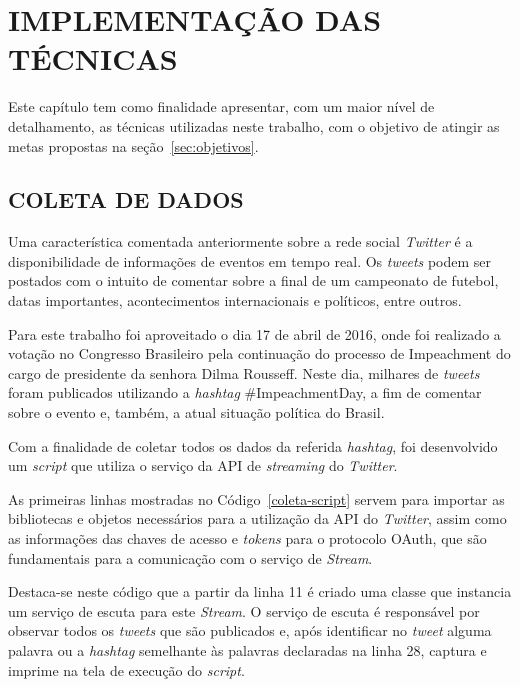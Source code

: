 \chapter{IMPLEMENTAÇÃO DAS TÉCNICAS}\label{ch:implementacao}

Este capítulo tem como finalidade apresentar, com um maior nível de detalhamento, as técnicas utilizadas neste trabalho, com o objetivo de atingir as metas propostas na seção~\ref{sec:objetivos}.

\section{COLETA DE DADOS}
Uma característica comentada anteriormente sobre a rede social \textit{Twitter} é a disponibilidade de informações de eventos em tempo real. Os \textit{tweets} podem ser postados com o intuito de comentar sobre a final de um campeonato de futebol, datas importantes, acontecimentos internacionais e políticos, entre outros.

Para este trabalho foi aproveitado o dia 17 de abril de 2016, onde foi realizado a votação no Congresso Brasileiro pela continuação do processo de Impeachment do cargo de presidente da senhora Dilma Rousseff. Neste dia, milhares de \textit{tweets} foram publicados utilizando a \textit{hashtag} \#ImpeachmentDay, a fim de comentar sobre o evento e, também, a atual situação política do Brasil.

Com a finalidade de coletar todos os dados da referida \textit{hashtag}, foi desenvolvido um \textit{script} que utiliza o serviço da API de \textit{streaming} do \textit{Twitter}.

As primeiras linhas mostradas no Código~\ref{coleta-script} servem para importar as bibliotecas e objetos necessários para a utilização da API do \textit{Twitter}, assim como as informações das chaves de acesso e \textit{tokens} para o protocolo OAuth, que são fundamentais para a comunicação com o serviço de \textit{Stream}.



Destaca-se neste código que a partir da linha 11 é criado uma classe que instancia um serviço de escuta para este \textit{Stream}. O serviço de escuta é responsável por observar todos os \textit{tweets} que são publicados e, após identificar no \textit{tweet} alguma palavra ou a \textit{hashtag} semelhante às palavras declaradas na linha 28, captura e imprime na tela de execução do \textit{script}.

